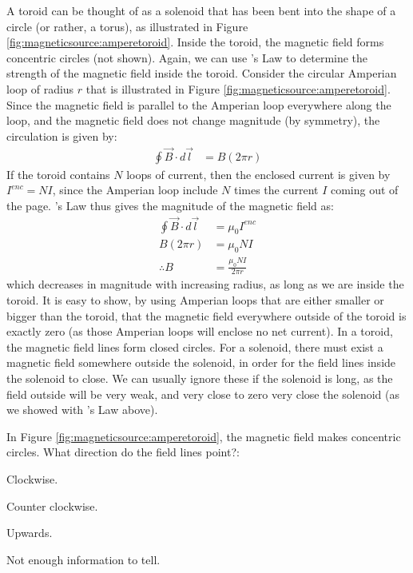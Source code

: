 A toroid can be thought of as a solenoid that has been bent into the shape of a circle (or rather, a torus), as illustrated in Figure \ref{fig:magneticsource:amperetoroid}. Inside the toroid, the magnetic field forms concentric circles (not shown). 
Again, we can use \ampere's Law to determine the strength of the magnetic field inside the toroid. Consider the circular Amperian loop of radius $r$ that is illustrated in Figure \ref{fig:magneticsource:amperetoroid}. Since the magnetic field is parallel to the Amperian loop everywhere along the loop, and the magnetic field does not change magnitude (by symmetry), the circulation is given by:
\begin{align*}
\oint \vec B \cdot d\vec l &= B (2\pi r)
\end{align*}
If the toroid contains $N$ loops of current, then the enclosed current is given by $I^{enc}=NI$, since the Amperian loop include $N$ times the current $I$ coming out of the page. \ampere's Law thus gives the magnitude of the magnetic field as:
\begin{align*}
\oint \vec B \cdot d\vec l &=\mu_0 I^{enc}\\
B (2\pi r) &= \mu_0 NI\\
\therefore B&=\frac{\mu_0 NI}{2\pi r}
\end{align*}
which decreases in magnitude with increasing radius, as long as we are inside the toroid. It is easy to show, by using Amperian loops that are either smaller or bigger than the toroid, that the magnetic field everywhere outside of the toroid is exactly zero (as those Amperian loops will enclose no net current). In a toroid, the magnetic field lines form closed circles. For a solenoid, there must exist a magnetic field somewhere outside the solenoid, in order for the field lines inside the solenoid to close. We can usually ignore these if the solenoid is long, as the field outside will be very weak, and very close to zero very close the solenoid (as we showed with \ampere's Law above). 

\begin{checkpoint}{}
	\begin{MCquestion}{In Figure \ref{fig:magneticsource:amperetoroid}, the magnetic field makes concentric circles. What direction do the field lines point?:}
		\item Clockwise.
		\item Counter clockwise. \correct
		\item Upwards.
		\item Not enough information to tell.
	\end{MCquestion}
\end{checkpoint}

